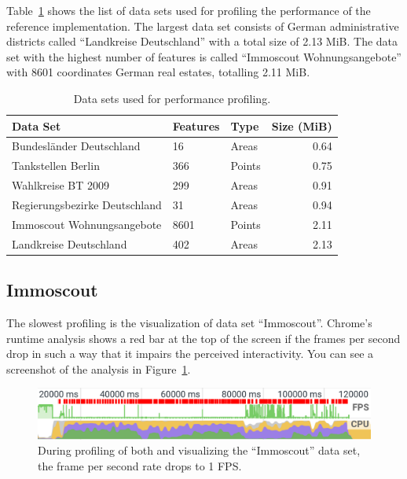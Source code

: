 Table~\ref{tab:evaluation:performance:data-sets} shows the list of data sets used for profiling the performance of the reference implementation.
The largest data set consists of German administrative districts called ``Landkreise Deutschland'' with a total size of 2.13 MiB.
The data set with the highest number of features is called ``Immoscout Wohnungsangebote'' with 8601 coordinates German real estates, totalling 2.11 MiB.

\begin{table}[ht]
  \centering
  \caption{Data sets used for performance profiling.}%
  \label{tab:evaluation:performance:data-sets}
  \begin{tabular}{lllr}
    Data Set & Features & Type & Size (MiB) \\
    \hline
    Bundesländer Deutschland      & 16   & Areas  & 0.64 \\
    Tankstellen Berlin            & 366  & Points & 0.75 \\
    Wahlkreise BT 2009            & 299  & Areas  & 0.91 \\
    Regierungsbezirke Deutschland & 31   & Areas  & 0.94 \\
    Immoscout Wohnungsangebote    & 8601 & Points & 2.11 \\
    Landkreise Deutschland        & 402  & Areas  & 2.13 \\
  \end{tabular}
\end{table}


\subsection{Immoscout}
The slowest profiling is the visualization of data set ``Immoscout''.
Chrome's runtime analysis shows a red bar at the top of the screen if the frames per second drop in such a way that it impairs the perceived interactivity.
You can see a screenshot of the analysis in Figure~\ref{fig:evaluation:performance:profiling:immoscout:fps}.


\begin{figure}[ht]
  \centering
  \includegraphics[width=\textwidth]{figures/evaluation/performance/profiles/immoscout_both/fps}
  \caption{During profiling of both \tmap{} and \gv{} visualizing the ``Immoscout'' data set, the frame per second rate drops to 1 FPS.}
  \label{fig:evaluation:performance:profiling:immoscout:fps}
\end{figure}

